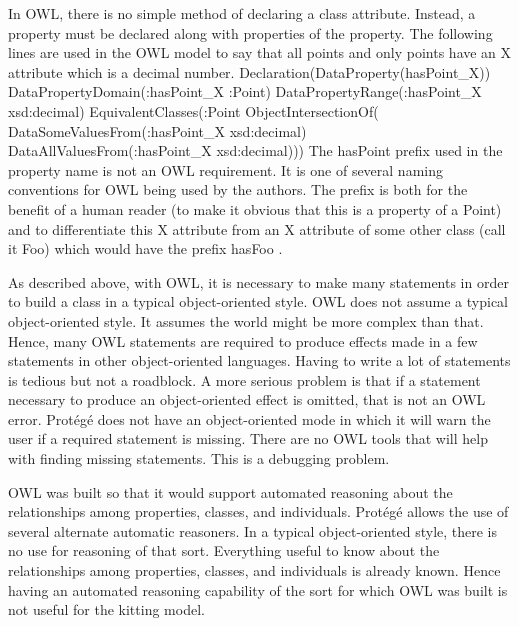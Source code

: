 In OWL, there is no simple method of declaring a class attribute. Instead,
a property must be declared along with properties of the property. The
following lines are used in the OWL model to say that all points and only
points have an X attribute which is a decimal number.
\newline
\newline \sf Declaration(DataProperty(hasPoint\_X))
\newline DataPropertyDomain(:hasPoint\_X :Point)
\newline DataPropertyRange(:hasPoint\_X xsd:decimal)
\newline EquivalentClasses(:Point ObjectIntersectionOf(
\newline \hspace*{0.2in}DataSomeValuesFrom(:hasPoint\_X xsd:decimal)
\newline \hspace*{0.2in}DataAllValuesFrom(:hasPoint\_X xsd:decimal))) \rm
\newline
\newline
The \sf hasPoint \rm prefix used in the property name is not an OWL
requirement. It is one of several naming conventions for OWL being used by
the authors. The prefix is both for the benefit of a human reader (to make
it obvious that this is a property of a Point) and to differentiate this X
attribute from an X attribute of some other class (call it \sf Foo\rm)
which would have the prefix \sf hasFoo \rm.

As described above, with OWL, it is necessary to make many statements in
order to build a class in a typical object-oriented style. OWL does not
assume a typical object-oriented style. It assumes the world might be more
complex than that. Hence, many OWL statements are required to produce
effects made in a few statements in other object-oriented languages. Having
to write a lot of statements is tedious but not a roadblock. A more serious
problem is that if a statement necessary to produce an object-oriented
effect is omitted, that is not an OWL error.  Prot\'{e}g\'{e} does not have an
object-oriented mode in which it will warn the user if a required statement
is missing. There are no OWL tools that will help with finding missing
statements. This is a debugging problem.

OWL was built so that it would support automated reasoning about the
relationships among properties, classes, and individuals.  Prot\'{e}g\'{e} allows
the use of several alternate automatic reasoners. In a typical
object-oriented style, there is no use for reasoning of that sort.
Everything useful to know about the relationships among properties,
classes, and individuals is already known. Hence having an automated
reasoning capability of the sort for which OWL was built is not useful
for the kitting model.\\

